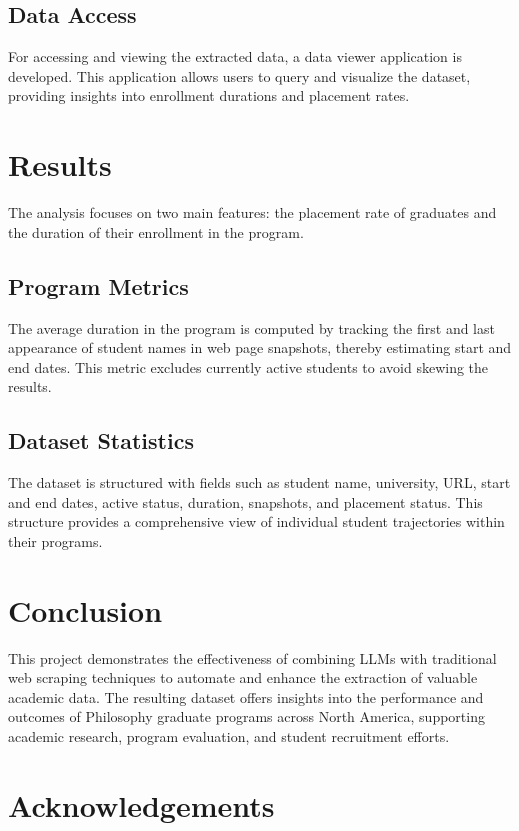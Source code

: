 \documentclass[11pt]{article}
\begin{document}
\subsection{Data Access}

    For accessing and viewing the extracted data, a data viewer application is developed. This application allows users to query and visualize the dataset, providing insights into enrollment durations and placement rates.

\section{Results}

    The analysis focuses on two main features: the placement rate of graduates and the duration of their enrollment in the program.

\subsection{Program Metrics}

    The average duration in the program is computed by tracking the first and last appearance of student names in web page snapshots, thereby estimating start and end dates. This metric excludes currently active students to avoid skewing the results.

\subsection{Dataset Statistics}

    The dataset is structured with fields such as student name, university, URL, start and end dates, active status, duration, snapshots, and placement status.
    This structure provides a comprehensive view of individual student trajectories within their programs.

\section{Conclusion}

    This project demonstrates the effectiveness of combining LLMs with traditional web scraping techniques to automate and enhance the extraction of valuable academic data.
    The resulting dataset offers insights into the performance and outcomes of Philosophy graduate programs across North America, supporting academic research, program evaluation, and student recruitment efforts.

\section{Acknowledgements}
\end{document}
